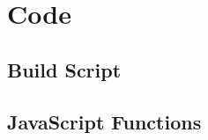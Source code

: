 \chapter{Code}

\section{Build Script}\label{sec:apxblasm}

    

\section{JavaScript Functions}\label{sec:apxmodule}

    